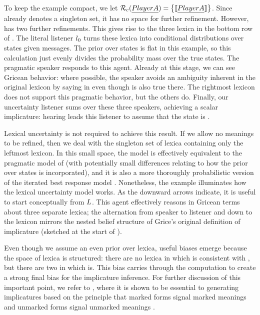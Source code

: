 \documentclass[leqno]{article}
\begin{document}
To keep the example compact, we let $\mathcal{R}_{c}(\emph{Player A}) =
\left\{ \llbracket\emph{Player A}\rrbracket \right\}$. Since  already denotes a
singleton set, it has no space for further refinement. However,
 has two further refinements. This gives rise to the
three lexica in the bottom row of . The
literal listener $l_{0}$ turns these lexica into conditional
distributions over states given messages.  The prior over states is
flat in this example, so this calculation just evenly divides the
probability mass over the true states. The pragmatic speaker responds
to this agent. Already at this stage, we can see Gricean behavior:
where possible, the speaker avoids an ambiguity inherent in the
original lexicon by saying  in  even
though  is also true there. The rightmost
lexicon does not support this pragmatic behavior, but the others
do. Finally, our uncertainty listener sums over these three speakers,
achieving a scalar implicature: hearing  leads
this listener to assume that the state is .

Lexical uncertainty is not required to achieve this result. If we
allow no meanings to be refined, then we deal with the singleton set
of lexica containing only the leftmost lexicon. In this small space,
the model is effectively equivalent to the pragmatic model of
\citet{Frank:Goodman:2012} (with potentially small differences
relating to how the prior over states is incorporated), and it is also
a more thoroughly probabilistic version of the iterated best response
model \citep{Franke09DISS,Jaeger:2007,Jaeger:2011}. Nonetheless, the
example illuminates how the lexical uncertainty model works. As the
downward arrows indicate, it is useful to start conceptually from
$L$. This agent effectively reasons in Gricean
terms about three separate lexica; the alternation from speaker to
listener and down to the lexicon mirrors the nested belief structure
of Grice's original definition of implicature (sketched at the start
of ).

Even though we assume an even prior over lexica, useful biases emerge
because the space of lexica is structured: there are no lexica in
which  is consistent with , but there are two in
which  is. This bias carries through the computation to
create a strong final bias for the implicature inference. For further
discussion of this important point, we refer to
\citet{Bergen:Levy:Goodman:2014}, where it is shown to be essential to
generating implicatures based on the principle that marked forms
signal marked meanings and unmarked forms signal unmarked meanings
\citep{McCawley78,Horn84,Blutner98,Levinson00}.
\end{document}
